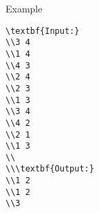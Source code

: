 Example
\begin{verbatim}
\textbf{Input:}
\\3 4
\\1 4
\\4 3
\\2 4
\\2 3
\\1 3
\\3 4
\\4 2
\\2 1
\\1 3
\\
\\\textbf{Output:}
\\1 2
\\1 2
\\3\end{verbatim}
